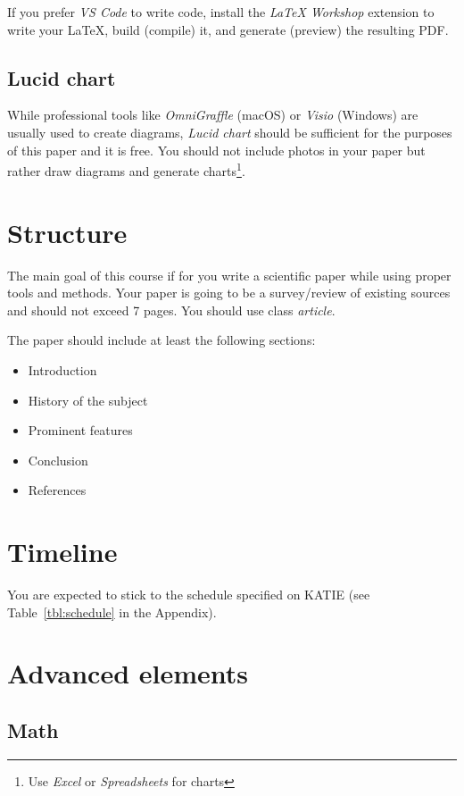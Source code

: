 \documentclass[nonacm]{acmart}
\begin{document}
If you prefer \emph{VS Code} to write code, install the \emph{LaTeX Workshop} extension to write your \LaTeX, build (compile) it, and generate (preview) the resulting PDF.

\subsection{Lucid chart}

While professional tools like \emph{OmniGraffle} (macOS) or \emph{Visio} (Windows) are usually used to create diagrams, \emph{Lucid chart} should be sufficient for the purposes of this paper and it is free. You should not include photos in your paper but rather draw diagrams and generate charts\footnote{Use \emph{Excel} or \emph{Spreadsheets} for charts}.

\section{Structure}

The main goal of this course if for you write a scientific paper while using proper tools and methods. Your paper is going to be a survey/review of existing sources and should not exceed 7 pages. You should use class \emph{article}.

The paper should include at least the following sections:

\begin{itemize}
    \item Introduction
    \item History of the subject
    \item Prominent features
    \item Conclusion
    \item References
\end{itemize}

\section{Timeline}

You are expected to stick to the schedule specified on KATIE (see Table~\ref{tbl:schedule} in the Appendix).

\section{Advanced elements}

\subsection{Math}
\end{document}

